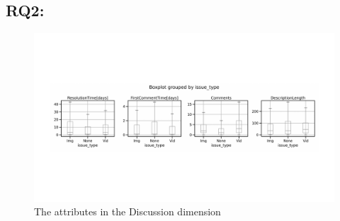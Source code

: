 \subsection*{RQ2: \RQtwo{}}
\begin{figure}[t]
    \centering
    \includegraphics[width=1\linewidth]{./figures/discussions.pdf}
    \caption{The attributes in the Discussion dimension}
    \label{fig:discussion}
\end{figure}

